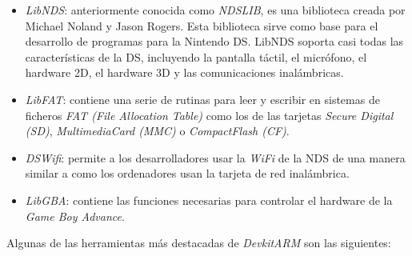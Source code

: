 \begin{itemize}
\item \textit{LibNDS}: anteriormente conocida como \textit{NDSLIB}, es una biblioteca creada por Michael Noland y Jason Rogers. Esta biblioteca sirve como base para el desarrollo de programas para la Nintendo DS. LibNDS soporta casi todas las características de la DS, incluyendo la pantalla táctil, el micrófono, el hardware 2D,
el hardware 3D y las comunicaciones inalámbricas.
%
\item \textit{LibFAT}: contiene una serie de rutinas para leer y escribir en sistemas de ficheros \textit{FAT (File Allocation Table)} como los de las tarjetas \textit{Secure Digital (SD)}, \textit{MultimediaCard (MMC)} o \textit{CompactFlash (CF)}.
%
\item \textit{DSWifi}: permite a los desarrolladores usar la \textit{WiFi} de la NDS de una manera similar a como los ordenadores usan la tarjeta de red inalámbrica.
%
\item \textit{LibGBA}: contiene las funciones necesarias para controlar el hardware de la \textit{Game Boy Advance}.
\end{itemize}

Algunas de las herramientas más destacadas de \textit{DevkitARM} son las siguientes:

